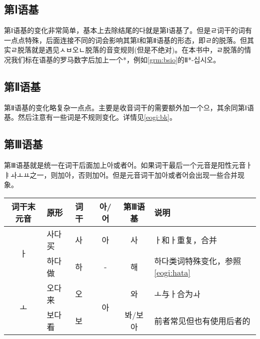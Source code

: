 \subsection{第Ⅰ语基}
第Ⅰ语基的变化非常简单，基本上去除结尾的다就是第Ⅰ语基了。但是ㄹ词干的词有一点点特殊，后面连接不同的词会影响其第Ⅰ和第Ⅱ语基的形态，即ㄹ的脱落。但其实ㄹ脱落就是遇见ㅅㅂ오ㄴ脱落的音变规则(但是不绝对)。在本书中，ㄹ脱落的情况我们标在语基的罗马数字后加上一个*，例如\ref{grm:bsio}的Ⅱ*-십시오。
\subsection{第Ⅱ语基}
第Ⅱ语基的变化略复杂一点点。主要是收音词干的需要额外加一个으，其余同第Ⅰ语基。然后注意有一些词是不规则变化。详情见\ref{eogi:bk}。
\subsection{第Ⅲ语基}
第Ⅲ语基就是统一在词干后面加上아或者어。如果词干最后一个元音是阳性元音ㅏㅑㅘㅗㅛ之一，则加아，否则加어。但是元音词干加아或者어会出现一些合并现象。\\
\begin{tabular}{|c|l|l|c|c|l|}
	\hline
	词干末元音              & 原形   & 词干 & 아/어                & 第Ⅲ语基 & 说明                         \\\hline
	\multirow{2}{*}{ㅏ} & 사다 买 & 사  & 아                  & 사    & ㅏ和ㅏ重复，合并                   \\\cline{2-6}
	                   & 하다 做 & 하  & -                  & 해    & 하다类词特殊变化，参照\ref{eogi:hata} \\\hline
	\multirow{2}{*}{ㅗ} & 오다 来 & 오  & \multirow{2}{*}{아} & 와    & ㅗ与ㅏ合为ㅘ                     \\\cline{2-3}\cline{5-6}
	                   & 보다 看 & 보  &                    & 봐/보아 & 前者常见但也有使用后者的               \\\hline
\end{tabular}\\
